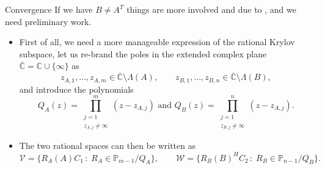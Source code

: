 \documentclass[aspectratio=169,xcolor=dvipsnames]{beamer}
\begin{document}
	\begin{frame}{Convergence}
	If we have $B \neq A^T$ things are more involved and due to \parencite{MR2854603}, and we need preliminary work.
	\begin{itemize}
		\item[\faBook] First of all, we need a more manageable expression of the rational Krylov subspace, let us re-brand the poles in the extended complex plane $\overline{\mathbb{C}} = \mathbb{C} \cup \{\infty\}$ as
		\[
		z_{A,1},\ldots,z_{A,m} \in \overline{\mathbb{C}} \setminus \Lambda(A), \qquad z_{B,1},\ldots,z_{B,n} \in \overline{\mathbb{C}} \setminus \Lambda(B),
		\] 
		and introduce the polynomials 
		\[Q_A(z) = \prod_{\substack{j=1\\z_{A,j} \neq \infty}}^m (z-z_{A,j}) \text{ and }Q_B(z) = \prod_{\substack{j=1\\z_{B,j} \neq \infty}}^n (z-z_{A,j}).\]
		\item[\faBook]<2-> The two rational spaces can then be written as
		\[
		\mathcal{V} = \{ R_A(A)C_1 \,:\; R_A \in \mathbb{P}_{m-1}/Q_A \}, \qquad \mathcal{W} = \{ R_B(B)^H C_2 \,:\; R_B \in \mathbb{P}_{n-1}/Q_B \}.
		\]
	\end{itemize}
	
	\end{frame}
\end{document}
